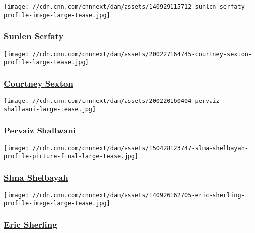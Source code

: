 \href{/profiles/sunlen-serfaty-profile}{}

\texttt{[image: //cdn.cnn.com/cnnnext/dam/assets/140929115712-sunlen-serfaty-profile-image-large-tease.jpg]}

\hypertarget{sunlen-serfaty}{%
\subsubsection{\texorpdfstring{\href{/profiles/sunlen-serfaty-profile}{Sunlen
Serfaty}}{Sunlen Serfaty}}\label{sunlen-serfaty}}

\href{/profiles/courtney-sexton}{}

\texttt{[image: //cdn.cnn.com/cnnnext/dam/assets/200227164745-courtney-sexton-profile-large-tease.jpg]}

\hypertarget{courtney-sexton}{%
\subsubsection{\texorpdfstring{\href{/profiles/courtney-sexton}{Courtney
Sexton}}{Courtney Sexton}}\label{courtney-sexton}}

\href{/profiles/pervaiz-shallwani}{}

\texttt{[image: //cdn.cnn.com/cnnnext/dam/assets/200220160404-pervaiz-shallwani-large-tease.jpg]}

\hypertarget{pervaiz-shallwani}{%
\subsubsection{\texorpdfstring{\href{/profiles/pervaiz-shallwani}{Pervaiz
Shallwani}}{Pervaiz Shallwani}}\label{pervaiz-shallwani}}

\href{/profiles/slma-shelbayah}{}

\texttt{[image: //cdn.cnn.com/cnnnext/dam/assets/150428123747-slma-shelbayah-profile-picture-final-large-tease.jpg]}

\hypertarget{slma-shelbayah}{%
\subsubsection{\texorpdfstring{\href{/profiles/slma-shelbayah}{Slma
Shelbayah}}{Slma Shelbayah}}\label{slma-shelbayah}}

\href{/profiles/eric-sherling-profile}{}

\texttt{[image: //cdn.cnn.com/cnnnext/dam/assets/140926162705-eric-sherling-profile-image-large-tease.jpg]}

\hypertarget{eric-sherling-}{%
\subsubsection{\texorpdfstring{\href{/profiles/eric-sherling-profile}{Eric
Sherling }}{Eric Sherling }}\label{eric-sherling-}}

